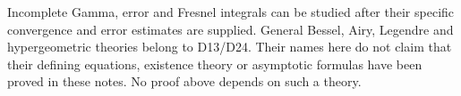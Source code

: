 \begin{remark}
Incomplete Gamma, error and Fresnel integrals can be studied after their specific
convergence and error estimates are supplied. General Bessel, Airy, Legendre and
hypergeometric theories belong to D13/D24. Their names here do not claim that
their defining equations, existence theory or asymptotic formulas have been proved
in these notes. No proof above depends on such a theory.
\end{remark}
